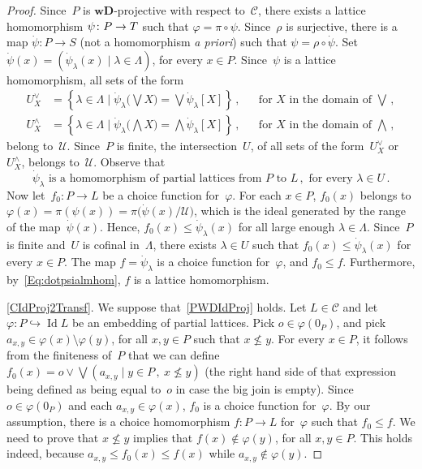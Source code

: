 \documentclass[reqno]{amsart}
\numberwithin{equation}{section}
\theoremstyle{plain}
\theoremstyle{definition}
\theoremstyle{remark}
\numberwithin{figure}{section}
\numberwithin{table}{section}
\begin{document}
\begin{proof}
Since~$P$ is ${\mathbf{wD}}$-projective with respect to~${\mathcal{C}}$, there exists a lattice homomorphism $\psi\colon P\to\nobreak T$ such that ${\varphi}=\pi\circ\psi$.
Since~$\rho$ is surjective, there is a map $\dot{\psi}\colon P\to S$ (not a homomorphism \emph{a priori}) such that $\psi=\rho\circ\dot{\psi}$.
Set $\dot{\psi}(x)={\left({{\dot{\psi}_{\lambda}(x)}}\mid{{{\lambda}\in{\Lambda}}}\right)}$, for every $x\in P$.
Since~$\psi$ is a lattice homomorphism, all sets of the form
 \begin{align*}
 U^{\vee}_X&={{\left\{{{{{\lambda}\in{\Lambda}}}\mid{{\dot{\psi}_{\lambda}{\bigl({{\bigvee X}}\bigr)}=\bigvee\dot{\psi}_{\lambda}[X]}}}\right\}}}\,,
 &&\text{for }X\text{ in the domain of }\bigvee\,,\\
 U^{\wedge}_X&={{\left\{{{{{\lambda}\in{\Lambda}}}\mid{{\dot{\psi}_{\lambda}{\bigl({{\bigwedge X}}\bigr)}=\bigwedge\dot{\psi}_{\lambda}[X]}}}\right\}}}\,,
 &&\text{for }X\text{ in the domain of }\bigwedge\,,
 \end{align*}
belong to~${\mathcal{U}}$.
Since~$P$ is finite, the intersection~$U$, of all sets of the form~$U^{\vee}_X$ or~$U^{\wedge}_X$, belongs to~${\mathcal{U}}$.
Observe that
 \begin{equation}\label{Eq:dotpsialmhom}
 \dot{\psi}_{\lambda}\text{ is a homomorphism of partial lattices from }
 P\text{ to }L\,,\text{ for every }{\lambda}\in U\,.
 \end{equation}
Now let~$f_0\colon P\to L$ be a choice function for~${\varphi}$.
For each $x\in P$, $f_0(x)$ belongs to ${\varphi}(x)=\pi(\psi(x))=\pi{\bigl({{\dot{\psi}(x)/{\mathcal{U}}}}\bigr)}$, which is the ideal generated by the range of the map~$\dot{\psi}(x)$.
Hence, $f_0(x)\leq\dot{\psi}_{\lambda}(x)$ for all large enough ${\lambda}\in{\Lambda}$.
Since~$P$ is finite and~$U$ is cofinal in~${\Lambda}$, there exists ${\lambda}\in U$ such that $f_0(x)\leq\dot{\psi}_{\lambda}(x)$ for every $x\in P$.
The map $f=\dot{\psi}_{\lambda}$ is a choice function for~${\varphi}$, and $f_0\leq f$.
Furthermore, by~\eqref{Eq:dotpsialmhom}, $f$ is a lattice homomorphism.

\eqref{CIdProj2Transf}.
We suppose that~\eqref{PWDIdProj} holds.
Let $L\in{\mathcal{C}}$ and let ${\varphi}\colon P\hookrightarrow\operatorname{Id} L$ be an embedding of partial lattices.
Pick $o\in{\varphi}(0_P)$, and pick $a_{x,y}\in{\varphi}(x)\setminus{\varphi}(y)$, for all $x,y\in P$ such that $x\nleq y$.
For every $x\in P$, it follows from the finiteness of~$P$ that we can define $f_0(x)=o\vee\bigvee{\left({{a_{x,y}}}\mid{{y\in P\,,\ x\nleq y}}\right)}$ (the right hand side of that expression being defined as being equal to~$o$ in case the big join is empty).
Since $o\in{\varphi}(0_P)$ and each $a_{x,y}\in{\varphi}(x)$, $f_0$ is a choice function for~${\varphi}$.
By our assumption, there is a choice homomorphism $f\colon P\to L$ for~${\varphi}$ such that $f_0\leq f$.
We need to prove that $x\nleq y$ implies that $f(x)\notin{\varphi}(y)$, for all $x,y\in P$.
This holds indeed, because $a_{x,y}\leq f_0(x)\leq f(x)$ while $a_{x,y}\notin{\varphi}(y)$.


\end{proof}
\end{document}
